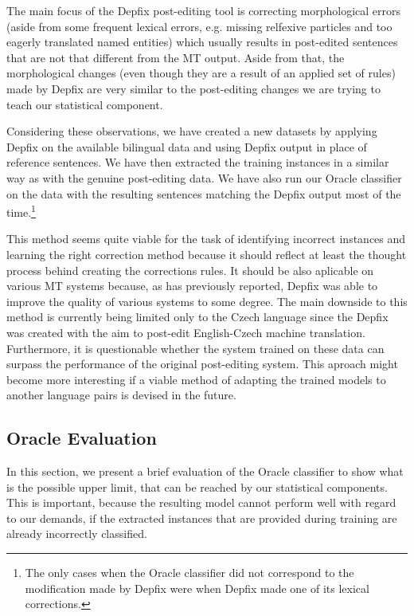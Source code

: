 The main focus of the Depfix post-editing tool is correcting morphological errors (aside from some
frequent lexical errors, e.g. missing relfexive particles and too eagerly translated named entities) which usually 
results in post-edited sentences that are not that different from the MT output. Aside from that,
the morphological changes (even though they are a result of an applied set of rules) made
by Depfix are very similar to the post-editing changes we are trying to teach our statistical component.

Considering these observations, we have created a new datasets by applying Depfix on the available bilingual data and
using Depfix output in place of reference sentences. We have then extracted the training instances in a
similar way as with the genuine post-editing data. We have also run our Oracle classifier on the data with
the resulting sentences matching the Depfix output most of the time.\footnote{The only cases when the Oracle classifier
did not correspond to the modification made by Depfix were when Depfix made one of its lexical corrections.}

This method seems quite viable for the task of identifying incorrect instances and learning the
right correction method because it should reflect at least the thought process behind creating the corrections rules.
It should be also aplicable on various MT systems because, as \citet{depfix:2014} has
previously reported, Depfix was able to improve the quality of various systems to some degree.
The main downside to this method is currently being
limited only to the Czech language since the Depfix was
created with the aim to post-edit English-Czech machine translation.
Furthermore, it is questionable whether the system trained on these data can surpass the performance
of the original post-editing system. 
This aproach might become more interesting if a viable method of adapting the trained models
to another language pairs is devised in the future.

\subsection{Oracle Evaluation}

In this section, we present a brief evaluation of the Oracle classifier to show
what is the possible upper limit, that can be reached by our statistical components. This is
important, because the resulting model cannot perform well with regard to our demands, if the extracted
instances that are provided during training are already incorrectly classified.

